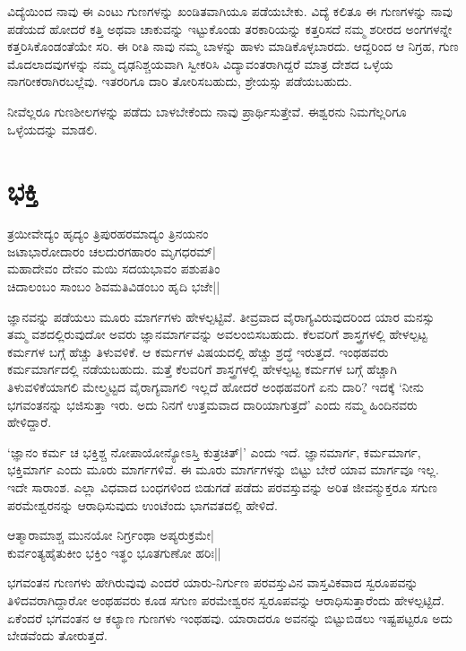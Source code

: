 ವಿದ್ಯೆಯಿಂದ ನಾವು ಈ ಎಂಟು 
ಗುಣಗಳನ್ನು ಖಂಡಿತವಾಗಿಯೂ 
ಪಡೆಯಬೇಕು. ವಿದ್ಯೆ ಕಲಿತೂ ಈ 
ಗುಣಗಳನ್ನು ನಾವು ಪಡೆಯದೆ 
ಹೋದರೆ ಕತ್ತಿ ಅಥವಾ 
ಚಾಕುವನ್ನು ಇಟ್ಟುಕೊಂಡು 
ತರಕಾರಿಯನ್ನು ಕತ್ತರಿಸದೆ 
ನಮ್ಮ ಶರೀರದ ಅಂಗಗಳನ್ನೇ 
ಕತ್ತರಿಸಿಕೊಂಡಂತೆಯೇ ಸರಿ. ಈ 
ರೀತಿ ನಾವು ನಮ್ಮ ಬಾಳನ್ನು 
ಹಾಳು ಮಾಡಿಕೊಳ್ಳಬಾರದು. 
ಆದ್ದರಿಂದ ಆ ನಿಗ್ರಹ, ಗುಣ 
ಮೊದಲಾದವುಗಳನ್ನು ನಮ್ಮ 
ದೃಢನಿಶ್ಚಯವಾಗಿ ಸ್ವೀಕರಿಸಿ 
ವಿದ್ಯಾವಂತರಾಗಿದ್ದರೆ ಮಾತ್ರ 
ದೇಶದ ಒಳ್ಳೆಯ 
ನಾಗರೀಕರಾಗಿರಬಲ್ಲೆವು. ಇತರರಿಗೂ ದಾರಿ ತೋರಿಸಬಹುದು, ಶ್ರೇಯಸ್ಸು ಪಡೆಯಬಹುದು.

ನೀವೆಲ್ಲರೂ ಗುಣಶೀಲಗಳನ್ನು 
ಪಡೆದು ಬಾಳಬೇಕೆಂದು ನಾವು 
ಪ್ರಾರ್ಥಿಸುತ್ತೇವೆ. ಈಶ್ವರನು ನಿಮಗೆಲ್ಲರಿಗೂ ಒಳ್ಳೆಯದನ್ನು ಮಾಡಲಿ. 

\newpage

\section{ಭಕ್ತಿ}

\begin{shloka}
ತ್ರಯೀವೇದ್ಯಂ ಹೃದ್ಯಂ ತ್ರಿಪುರಹರಮಾದ್ಯಂ ತ್ರಿನಯನಂ\\
ಜಟಾಭಾರೋದಾರಂ ಚಲದುರಗಹಾರಂ ಮೃಗಧರಮ್|\\
ಮಹಾದೇವಂ ದೇವಂ ಮಯಿ ಸದಯಭಾವಂ ಪಶುಪತಿಂ\\
ಚಿದಾಲಂಬಂ ಸಾಂಬಂ ಶಿವಮತಿವಿಡಂಬಂ ಹೃದಿ ಭಜೇ||
\end{shloka}

ಜ್ಞಾನವನ್ನು ಪಡೆಯಲು ಮೂರು 
ಮಾರ್ಗಗಳು ಹೇಳಲ್ಪಟ್ಟಿವೆ. 
ತೀವ್ರವಾದ 
ವೈರಾಗ್ಯವಿರುವುದರಿಂದ ಯಾರ 
ಮನಸ್ಸು ತಮ್ಮ ವಶದಲ್ಲಿರುವುದೋ 
ಅವರು ಜ್ಞಾನಮಾರ್ಗವನ್ನು 
ಅವಲಂಬಿಸಬಹುದು. ಕೆಲವರಿಗೆ 
ಶಾಸ್ತ್ರಗಳಲ್ಲಿ ಹೇಳಲ್ಪಟ್ಟ 
ಕರ್ಮಗಳ ಬಗ್ಗೆ ಹೆಚ್ಚು 
ತಿಳುವಳಿಕೆ. ಆ ಕರ್ಮಗಳ 
ವಿಷಯದಲ್ಲಿ ಹೆಚ್ಚು ಶ್ರದ್ಧೆ 
ಇರುತ್ತದೆ. ಇಂಥಹವರು 
ಕರ್ಮಮಾರ್ಗದಲ್ಲಿ ನಡೆಯಬಹುದು. 
ಮತ್ತೆ ಕೆಲವರಿಗೆ 
ಶಾಸ್ತ್ರಗಳಲ್ಲಿ ಹೇಳಲ್ಪಟ್ಟ 
ಕರ್ಮಗಳ ಬಗ್ಗೆ ಹೆಚ್ಚಾಗಿ 
ತಿಳುವಳಿಕೆಯಾಗಲಿ ಮೇಲ್ಮಟ್ಟದ 
ವೈರಾಗ್ಯವಾಗಲಿ ಇಲ್ಲದೆ ಹೋದರೆ 
ಅಂಥಹವರಿಗೆ ಏನು ದಾರಿ? ಇದಕ್ಕೆ 
`ನೀನು ಭಗವಂತನನ್ನು 
ಭಜಿಸುತ್ತಾ ಇರು. ಅದು ನಿನಗೆ 
ಉತ್ತಮವಾದ ದಾರಿಯಾಗುತ್ತದೆ' ಎಂದು ನಮ್ಮ ಹಿಂದಿನವರು ಹೇಳಿದ್ದಾರೆ.

`ಜ್ಞಾನಂ ಕರ್ಮ ಚ ಭಕ್ತಿಶ್ಚ 
ನೋಪಾಯೋನ್ಯೋಽಸ್ತಿ 
ಕುತ್ರಚಿತ್|' ಎಂದು ಇದೆ. 
ಜ್ಞಾನಮಾರ್ಗ, ಕರ್ಮಮಾರ್ಗ, 
ಭಕ್ತಿಮಾರ್ಗ ಎಂದು ಮೂರು 
ಮಾರ್ಗಗಳಿವೆ. ಈ ಮೂರು 
ಮಾರ್ಗಗಳನ್ನು ಬಿಟ್ಟು ಬೇರೆ 
ಯಾವ ಮಾರ್ಗವೂ ಇಲ್ಲ. ಇದೇ 
ಸಾರಾಂಶ. ಎಲ್ಲಾ ವಿಧವಾದ 
ಬಂಧಗಳಿಂದ ಬಿಡುಗಡೆ ಪಡೆದು 
ಪರವಸ್ತುವನ್ನು ಅರಿತ 
ಜೀವನ್ಮುಕ್ತರೂ ಸಗುಣ ಪರಮೇಶ್ವರನನ್ನು ಆರಾಧಿಸುವುದು ಉಂಟೆಂದು ಭಾಗವತದಲ್ಲಿ ಹೇಳಿದೆ.

\begin{shloka}
ಆತ್ಮಾರಾಮಾಶ್ಚ ಮುನಯೋ ನಿರ್ಗ್ರಂಥಾ ಅಪ್ಯರುಕ್ರಮೇ|\\
ಕುರ್ವಂತ್ಯಹೈತುಕೀಂ ಭಕ್ತಿಂ ಇತ್ಥಂ ಭೂತಗುಣೋ ಹರಿಃ||
\end{shloka}

ಭಗವಂತನ ಗುಣಗಳು ಹೇಗಿರುವುವು 
ಎಂದರೆ ಯಾರು-ನಿರ್ಗುಣ 
ಪರವಸ್ತುವಿನ ವಾಸ್ತವಿಕವಾದ 
ಸ್ವರೂಪವನ್ನು 
ತಿಳಿದವರಾಗಿದ್ದಾರೋ ಅಂಥಹವರು 
ಕೂಡ ಸಗುಣ ಪರಮೇಶ್ವರನ 
ಸ್ವರೂಪವನ್ನು 
ಆರಾಧಿಸುತ್ತಾರೆಂದು 
ಹೇಳಲ್ಪಟ್ಟಿದೆ. ಏಕೆಂದರೆ 
ಭಗವಂತನ ಆ ಕಲ್ಯಾಣ ಗುಣಗಳು 
ಇಂಥಹವು. ಯಾರಾದರೂ ಅವನನ್ನು ಬಿಟ್ಟುಬಿಡಲು ಇಷ್ಟಪಟ್ಟರೂ ಅದು ಬೇಡವೆಂದು ತೋರುತ್ತದೆ.

